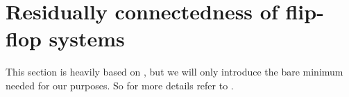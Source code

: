 \chapter{Residually connectedness of flip-flop systems}
\label{sec:flipflopsystems}

This section is heavily based on \cite{horn:kac-moody}, but we will only introduce the bare minimum needed for our purposes. So for more details refer to \cite{horn:kac-moody}.




